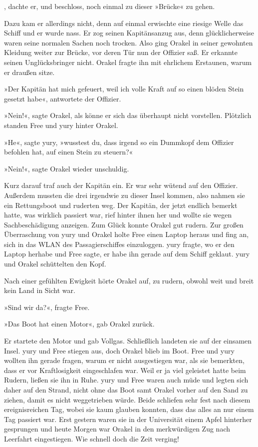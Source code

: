 , dachte er, und beschloss, noch einmal zu dieser »Brücke« zu gehen.

Dazu kam er allerdings nicht, denn auf einmal erwischte eine riesige Welle das Schiff und er wurde nass. Er zog seinen Kapitänsanzug aus, denn glücklicherweise waren seine normalen Sachen noch trocken. Also ging Orakel in seiner gewohnten Kleidung weiter zur Brücke, vor deren Tür nun der Offizier saß. Er erkannte seinen Unglücksbringer nicht. Orakel fragte ihn mit ehrlichem Erstaunen, warum er draußen sitze.

»Der Kapitän hat mich gefeuert, weil ich volle Kraft auf so einen blöden Stein gesetzt habe«, antwortete der Offizier.

»Nein!«, sagte Orakel, als könne er sich das überhaupt nicht vorstellen. Plötzlich standen Free und yury hinter Orakel.

»He«, sagte yury, »wusstest du, dass irgend so ein Dummkopf dem Offizier befohlen hat, auf einen Stein zu steuern?«

»Nein!«, sagte Orakel wieder unschuldig.

Kurz darauf traf auch der Kapitän ein. Er war sehr wütend auf den Offizier. Außerdem mussten die drei irgendwie zu dieser Insel kommen, also nahmen sie ein Rettungsboot und ruderten weg. Der Kapitän, der jetzt endlich bemerkt hatte, was wirklich passiert war, rief hinter ihnen her und wollte sie wegen Sachbeschädigung anzeigen. Zum Glück konnte Orakel gut rudern. Zur großen Überraschung von yury und Orakel holte Free einen Laptop heraus und fing an, sich in das WLAN des Passagierschiffes einzuloggen. yury fragte, wo er den Laptop herhabe und Free sagte, er habe ihn gerade auf dem Schiff geklaut. yury und Orakel schüttelten den Kopf.

Nach einer gefühlten Ewigkeit hörte Orakel auf, zu rudern, obwohl weit und breit kein Land in Sicht war.

»Sind wir da?«, fragte Free.

»Das Boot hat einen Motor«, gab Orakel zurück.

Er startete den Motor und gab Vollgas. Schließlich landeten sie auf der einsamen Insel. yury und Free stiegen aus, doch Orakel blieb im Boot. Free und yury wollten ihn gerade fragen, warum er nicht ausgestiegen war, als sie bemerkten, dass er vor Kraftlosigkeit eingeschlafen war. Weil er ja viel geleistet hatte beim Rudern, ließen sie ihn in Ruhe. yury und Free waren auch müde und legten sich daher auf den Strand, nicht ohne das Boot samt Orakel vorher auf den Sand zu ziehen, damit es nicht weggetrieben würde. Beide schliefen sehr fest nach diesem ereignisreichen Tag, wobei sie kaum glauben konnten, dass das alles an nur einem Tag passiert war. Erst gestern waren sie in der Universität einem Apfel hinterher gesprungen und heute Morgen war Orakel in den merkwürdigen Zug nach Leerfahrt eingestiegen. Wie schnell doch die Zeit verging!

